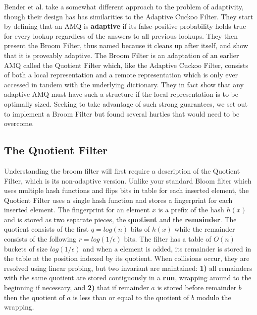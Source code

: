 \documentclass[../paper.tex]{subfiles}
\begin{document}
    Bender et al. \cite{broom-filter} take a somewhat different approach to the
    problem of adaptivity, though their design has has similarities to the
    Adaptive Cuckoo Filter.  They start by defining that an AMQ is {\bf
    adaptive} if its false-positive probability holds true for every lookup
    regardless of the answers to all previous lookups.  They then present the
    Broom Filter, thus named because it cleans up after itself, and show that
    it is proveably adaptive.  The Broom Filter is an adaptation of an earlier
    AMQ called the Quotient Filter \cite{quotient-filter} which, like the
    Adaptive Cuckoo Filter, consists of both a local representation and a
    remote representation which is only ever accessed in tandem with the
    underlying dictionary.   They in fact show that any adaptive AMQ must have
    such a structure if the local representation is to be optimally sized.
    Seeking to take advantage of such strong guarantees, we set out to
    implement a Broom Filter but found several hurtles that would need to be
    overcome.  
	
\subsection{The Quotient Filter}

    Understanding the broom filter will first
    require a description of the Quotient Filter, which is its non-adaptive
    version.   Unlike your standard Bloom filter which uses multiple hash functions
    and flips bits in table for each inserted element, the Quotient Filter uses a
    single hash function and stores a fingerprint for each inserted element.  The
    fingerprint for an element $x$ is a prefix of the hash $h(x)$ and is stored as
    two separate pieces, the {\bf quotient} and the {\bf remainder}.  The quotient
    consists of the first $q = log(n)$ bits of $h(x)$ while the remainder consists
    of the following $r = log(1/\epsilon)$ bits.  The filter has a table of $O(n)$
    buckets of size $log(1/\epsilon)$ and when a element is added, its remainder is
    stored in the table at the position indexed by its quotient.  When collisions
    occur, they are resolved using linear probing, but two invariant are
    maintained: {\bf 1)} all remainders with the same quotient are stored
    contiguously in a {\bf run}, wrapping around to the beginning if necessary, and
    {\bf 2)} that if remainder $a$ is stored before remainder $b$ then the quotient
    of $a$ is less than or equal to the quotient of $b$ modulo the wrapping.  
\end{document}
